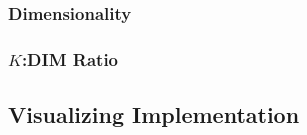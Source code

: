     \subsubsection{Dimensionality}

    \subsubsection{$K$:DIM Ratio}

\subsection{Visualizing Implementation}



